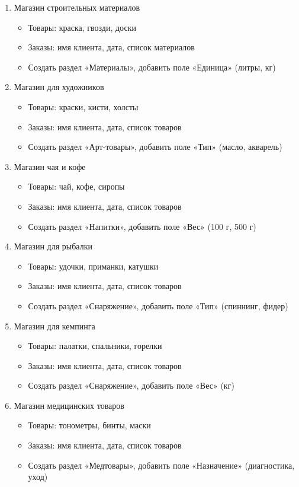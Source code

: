\documentclass[12pt]{article}
\numberwithin{listing}{section}
\numberwithin{figure}{section}
\begin{document}
\begin{enumerate}
\item Магазин строительных материалов
\begin{itemize}
\item Товары: краска, гвозди, доски
\item Заказы: имя клиента, дата, список материалов
\item Создать раздел «Материалы», добавить поле «Единица» (литры, кг)
\end {itemize}

\item Магазин для художников
\begin{itemize}
	\item Товары: краски, кисти, холсты
	\item Заказы: имя клиента, дата, список товаров
	\item Создать раздел «Арт-товары», добавить поле «Тип» (масло, акварель)
\end{itemize}

\item Магазин чая и кофе
\begin{itemize}
	\item Товары: чай, кофе, сиропы
	\item Заказы: имя клиента, дата, список товаров
	\item Создать раздел «Напитки», добавить поле «Вес» (100 г, 500 г)
\end{itemize}

\item Магазин для рыбалки
\begin{itemize}
	\item Товары: удочки, приманки, катушки
	\item Заказы: имя клиента, дата, список товаров
	\item Создать раздел «Снаряжение», добавить поле «Тип» (спиннинг, фидер)
\end{itemize}

\item Магазин для кемпинга
\begin{itemize}
	\item Товары: палатки, спальники, горелки
	\item Заказы: имя клиента, дата, список товаров
	\item Создать раздел «Снаряжение», добавить поле «Вес» (кг)
\end{itemize}

\item Магазин медицинских товаров
\begin{itemize}
	\item Товары: тонометры, бинты, маски
	\item Заказы: имя клиента, дата, список товаров
	\item Создать раздел «Медтовары», добавить поле «Назначение» (диагностика, уход)
\end{itemize}


\end{enumerate}
\end{document}
